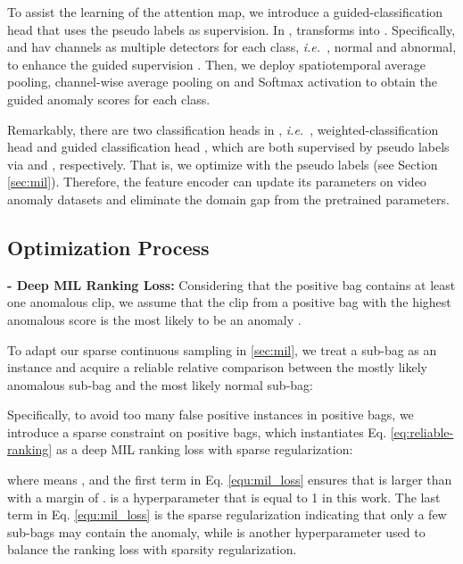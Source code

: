 \documentclass[final]{cvpr}
\newcommand{\jcst}{\textcolor[rgb]{0,0,0}}
\newcommand{\jcnd}{\textcolor[rgb]{0,0.,0}}
\newcommand{\jcgam}{\textcolor[rgb]{0.,0.,0}}
\newcommand{\jcca}{\textcolor[rgb]{0,0,0}}
\renewcommand{\ie}{\textit{i.e.\ }}
\begin{document}
\jcst{To assist the learning of the attention map, we introduce a guided-classification head  that uses the pseudo labels as supervision. \jcca{In} \jcca{,  transforms  into . Specifically,  and  hav  channels as  multiple detectors for each class, \ie, normal and abnormal, to enhance the guided supervision \cite{yang2018weakly}.}
Then, we deploy spatiotemporal average pooling,  channel-wise average pooling on  and Softmax activation to obtain the guided anomaly scores for each class. }


\jcst{Remarkably, there are two classification heads in , \ie, weighted-classification head  and guided classification head , which are both supervised by pseudo labels via  and , respectively. That is, we optimize   with the pseudo labels (see Section \ref{sec:mil}). Therefore, the feature encoder  can update its parameters on video anomaly datasets and eliminate the domain gap from the pretrained parameters. }





\vspace{-0.1cm}
\subsection{Optimization Process}
\label{sec:obj_func}
\vspace{-0.1cm}


\noindent\textbf{- Deep MIL Ranking Loss:}
Considering that the positive bag contains at least one anomalous clip, we assume that the clip from a positive bag with the highest anomalous score is the most likely to be an anomaly \cite{hong2020mini}.\jcnd{To adapt our sparse continuous sampling in \ref{sec:mil}, we treat a sub-bag as an instance and acquire a reliable relative comparison between the mostly likely anomalous sub-bag and the most likely normal sub-bag:

Specifically, to avoid too many false positive instances in positive bags, we introduce a sparse constraint on positive bags, which instantiates Eq. \ref{eq:reliable-ranking} as a deep MIL ranking loss with sparse regularization:}
\vspace{0.05cm}

where  means , and the first term in Eq. \ref{equ:mil_loss} ensures that  is larger than  with a margin of .  is a hyperparameter that is equal to 1 in this work. 
\jcgam{The last term in Eq. \ref{equ:mil_loss} is the sparse regularization indicating that only a few sub-bags may contain the anomaly,}
 while  is another hyperparameter used to balance the ranking loss with sparsity regularization.
\end{document}
